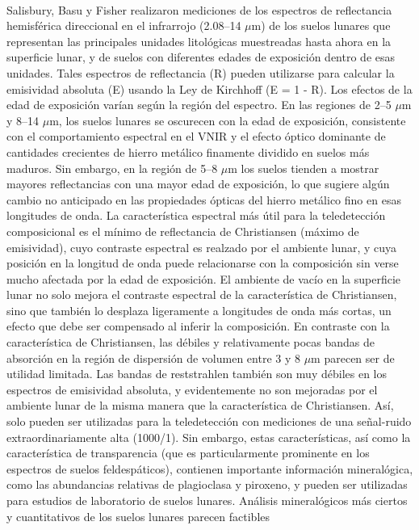 \documentclass[12pt]{article}
\begin{document}
\\
Salisbury, Basu y Fisher realizaron mediciones de los espectros de reflectancia hemisférica 
direccional en el 
infrarrojo (2.08–14 $\mu$m) de los suelos lunares que representan las 
principales unidades litológicas muestreadas hasta ahora en la superficie 
lunar, y de suelos con diferentes edades de exposición dentro de esas 
unidades. Tales espectros de reflectancia (R) pueden utilizarse para 
calcular la emisividad absoluta (E) usando la Ley de Kirchhoff (E = 1 - R). 
Los efectos de la edad de exposición varían según la región del espectro. 
En las regiones de 2–5 $\mu$m y 8–14 $\mu$m, los suelos lunares se oscurecen 
con la edad de exposición, consistente con el comportamiento espectral en el 
VNIR y el efecto óptico dominante de cantidades crecientes de hierro metálico 
finamente dividido en suelos más maduros. Sin embargo, en la región de 5–8 
$\mu$m los suelos tienden a mostrar mayores reflectancias con una mayor edad 
de exposición, lo que sugiere algún cambio no anticipado en las propiedades 
ópticas del hierro metálico fino en esas longitudes de onda. La característica 
espectral más útil para la teledetección composicional es el mínimo de 
reflectancia de Christiansen (máximo de emisividad), cuyo contraste espectral 
es realzado por el ambiente lunar, y cuya posición en la longitud de onda puede 
relacionarse con la composición sin verse mucho afectada por la edad de 
exposición. El ambiente de vacío en la superficie lunar no solo mejora el 
contraste espectral de la característica de Christiansen, sino que también lo 
desplaza ligeramente a longitudes de onda más cortas, un efecto que debe ser 
compensado al inferir la composición. En contraste con la característica de 
Christiansen, las débiles y relativamente pocas bandas de absorción 
en la región de dispersión de volumen entre 3 y 8 $\mu$m 
parecen ser de utilidad limitada. Las bandas de reststrahlen también son muy 
débiles en los espectros de emisividad absoluta, y evidentemente no son mejoradas 
por el ambiente lunar de la misma manera que la característica de Christiansen. 
Así, solo pueden ser utilizadas para la teledetección con mediciones de una 
señal-ruido extraordinariamente alta (1000/1). Sin embargo, estas características, 
así como la característica de transparencia (que es particularmente prominente en 
los espectros de suelos feldespáticos), contienen importante información 
mineralógica, como las abundancias relativas de plagioclasa y piroxeno, y pueden 
ser utilizadas para estudios de laboratorio de suelos lunares. Análisis 
mineralógicos más ciertos y cuantitativos de los suelos lunares parecen factibles 
\end{document}
